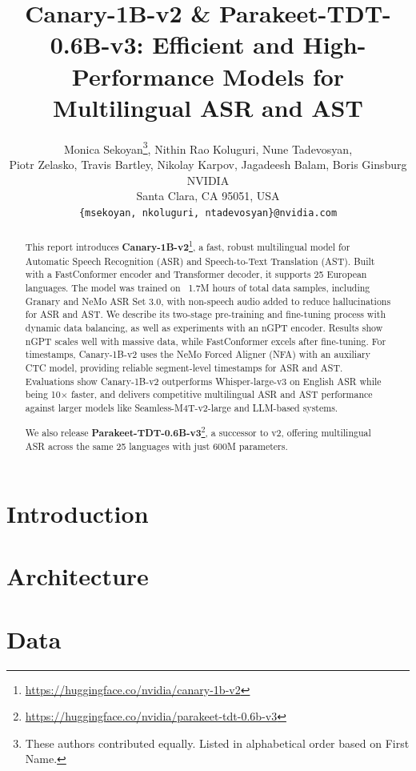 \documentclass{article} %
\title{Canary-1B-v2 \& Parakeet-TDT-0.6B-v3: Efficient and High-Performance Models for Multilingual ASR and AST}
\author{Monica Sekoyan\thanks{These authors contributed equally. Listed in alphabetical order based on First Name.}, Nithin Rao Koluguri\footnotemark[1], Nune Tadevosyan\footnotemark[1], \\
Piotr Zelasko, Travis Bartley, Nikolay Karpov, Jagadeesh Balam, Boris Ginsburg \\
NVIDIA \\
Santa Clara, CA 95051, USA \\
\texttt{\{msekoyan, nkoluguri, ntadevosyan\}@nvidia.com}
}
\begin{document}
\maketitle

\fancyhead{}

\begin{abstract}
This report introduces \textbf{Canary-1B-v2}\footnote{\url{https://huggingface.co/nvidia/canary-1b-v2}}, a fast, robust multilingual model for Automatic Speech Recognition (ASR) and Speech-to-Text Translation (AST). Built with a FastConformer encoder and Transformer decoder, it supports 25 European languages. The model was trained on ~1.7M hours of total data samples, including Granary and NeMo ASR Set 3.0, with non-speech audio added to reduce hallucinations for ASR and AST. We describe its two-stage pre-training and fine-tuning process with dynamic data balancing, as well as experiments with an nGPT encoder. Results show nGPT scales well with massive data, while FastConformer excels after fine-tuning. For timestamps, Canary-1B-v2 uses the NeMo Forced Aligner (NFA) with an auxiliary CTC model, providing reliable segment-level timestamps for ASR and AST. Evaluations show Canary-1B-v2 outperforms Whisper-large-v3 on English ASR while being 10$\times$ faster, and delivers competitive multilingual ASR and AST performance against larger models like Seamless-M4T-v2-large and LLM-based systems.

We also release \textbf{Parakeet-TDT-0.6B-v3}\footnote{\url{https://huggingface.co/nvidia/parakeet-tdt-0.6b-v3}}, a successor to v2, offering multilingual ASR across the same 25 languages with just 600M parameters.

\end{abstract}



\section{Introduction}


\section{Architecture}


\section{Data}

\end{document}
